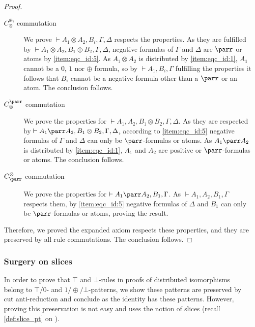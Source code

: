 \documentclass{lmcs}
\newcommand*{\tens}{\otimes} %
\renewcommand*{\fCenter}{\vdash} %
\newcommand{\comm}[2]{C_{#1}^{#2}} %
\begin{document}
\begin{proof}
\begin{description}
\item[$\comm{\tens}{\oplus_i}$ commutation]
We prove $\fCenter A_1\tens A_2,B_i,\Gamma,\Delta$ respects the properties.
As they are fulfilled by $\fCenter A_1\tens A_2,B_1\oplus B_2,\Gamma,\Delta$, negative formulas of $\Gamma$ and $\Delta$ are $\parr$ or atoms by \ref{item:eqc_id:5}.
As $A_1\tens A_2$ is distributed by \ref{item:eqc_id:1}, $A_1$ cannot be a $0$, $1$ nor $\oplus$ formula, so by $\fCenter A_1,B_i,\Gamma$ fulfilling the properties it follows that $B_i$ cannot be a negative formula other than a $\parr$ or an atom.
The conclusion follows.
\item[$\comm{\tens}{\parr}$ commutation]
We prove the properties for $\fCenter A_1, A_2,B_1\tens B_2,\Gamma,\Delta$.
As they are respected by $\fCenter  A_1\parr A_2,B_1\tens B_2,\Gamma,\Delta$, according to \ref{item:eqc_id:5} negative formulas of $\Gamma$ and $\Delta$ can only be $\parr$-formulas or atoms.
As $A_1\parr A_2$ is distributed by \ref{item:eqc_id:1}, $A_1$ and $A_2$ are positive or $\parr$-formulas or atoms.
The conclusion follows.
\item[$\comm{\parr}{\tens}$ commutation]
We prove the properties for $\fCenter A_1\parr A_2, B_1,\Gamma$.
As $\fCenter A_1, A_2,B_1,\Gamma$ respects them, by \ref{item:eqc_id:5} negative formulas of $\Delta$ and $B_1$ can only be $\parr$-formulas or atoms, proving the result.
\end{description}
Therefore, we proved the expanded axiom respects these properties, and they are preserved by all rule commutations.
The conclusion follows.
\end{proof}

\subsubsection{Surgery on slices}
\label{sec:pattern_dist_seqisos_slices}

In order to prove that $\top$ and $\bot$-rules in proofs of distributed isomorphisms belong to $\top/0$- and $1/\oplus/\bot$-patterns, we show these patterns are preserved by cut anti-reduction and conclude as the identity has these patterns.
However, proving this preservation is not easy and uses the notion of slices (recall \autoref{def:slice_pt} on ).
\end{document}
